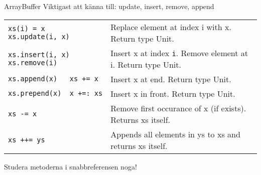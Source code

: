 \begin{Slide}{ArrayBuffer}
Viktigast att känna till: update, insert, remove, append
{\SlideFontTiny

\vspace{2.5em}\begin{tabular}{@{}p{4.2cm}  p{6.5cm}}
\texttt{xs(i) = x \newline xs.update(i, x)} & Replace element at index i with x. \newline Return type Unit.\\   \cline{1-2}

\texttt{xs.insert(i, x)\newline xs.remove(i)} & Insert x at index \texttt{i}. Remove element at i. \newline Return type Unit.\\   \cline{1-2}

\texttt{xs.append(x)~~~xs~+=~x} & Insert x at end.  Return type Unit.\\   \cline{1-2}

\texttt{xs.prepend(x)~~x~+=:~xs} & Insert x in front.  Return type Unit.\\   \cline{1-2}

\texttt{xs -= x} & Remove first occurance of x (if exists). \newline Returns xs itself. \\\cline{1-2}

\texttt{xs ++= ys} & Appends all elements in ys to xs and returns xs itself. \\

\end{tabular}
}

\vspace{2em}Studera metoderna i snabbreferensen noga!
\end{Slide}






